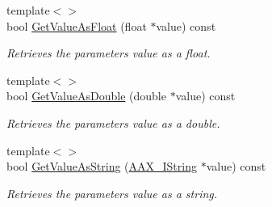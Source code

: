 \begin{DoxyCompactItemize}
{\footnotesize template$<$$>$ }\\bool \mbox{\hyperlink{a01533_a8484adc259a40c25ac8414eac475eea3}{Get\+Value\+As\+Float}} (float $\ast$value) const
\begin{DoxyCompactList}\small\item\em Retrieves the parameter\textquotesingle{}s value as a float. \end{DoxyCompactList}\item 
{\footnotesize template$<$$>$ }\\bool \mbox{\hyperlink{a01533_a1bb6bad348b137dd413abedd1de0c9ea}{Get\+Value\+As\+Double}} (double $\ast$value) const
\begin{DoxyCompactList}\small\item\em Retrieves the parameter\textquotesingle{}s value as a double. \end{DoxyCompactList}\item 
{\footnotesize template$<$$>$ }\\bool \mbox{\hyperlink{a01533_a96661507efdc490252bbfebe5d716c65}{Get\+Value\+As\+String}} (\mbox{\hyperlink{a01873}{A\+A\+X\+\_\+\+I\+String}} $\ast$value) const
\begin{DoxyCompactList}\small\item\em Retrieves the parameter\textquotesingle{}s value as a string. \end{DoxyCompactList}\end{DoxyCompactItemize}
